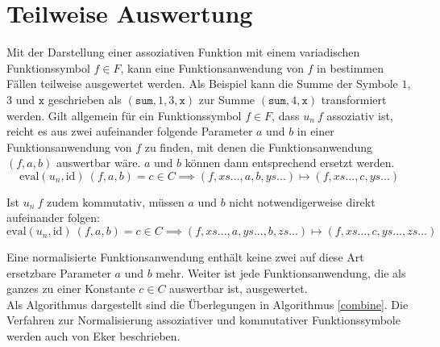 \section{Teilweise Auswertung} \label{subsecNormalKombinieren}

\begin{algorithm}
\DontPrintSemicolon
\caption{$\mathrm{combine} \colon T \rightarrow T$}\label{combine}

\end{algorithm}

Mit der Darstellung einer assoziativen Funktion mit einem variadischen Funktionssymbol $f \in F$, kann eine Funktionsanwendung von $f$ in bestimmen Fällen teilweise ausgewertet werden. Als Beispiel kann die Summe der Symbole $1$, $3$ und $\texttt{x}$ geschrieben als $(\texttt{sum}, 1, 3, \texttt{x})$ zur Summe $(\texttt{sum}, 4, \texttt{x})$ transformiert werden. 
Gilt allgemein für ein Funktionssymbol $f \in F$, dass $u_n~f$ assoziativ ist, reicht es aus zwei aufeinander folgende Parameter $a$ und $b$ in einer Funktionsanwendung von $f$ zu finden, mit denen die Funktionsanwendung $(f, a, b)$ auswertbar wäre. $a$ und $b$ können dann entsprechend ersetzt werden.
$$\mathrm{eval}(u_n, \mathrm{id})~(f, a, b) = c \in C \implies (f, xs..., a, b, ys...) \mapsto (f, xs..., c, ys...)$$

Ist $u_n~f$ zudem kommutativ, müssen $a$ und $b$ nicht notwendigerweise direkt aufeinander folgen:
$$\mathrm{eval}(u_n, \mathrm{id})~(f, a, b) = c \in C \implies (f, xs..., a, ys..., b, zs...) \mapsto (f, xs..., c, ys..., zs...)$$

Eine normalisierte Funktionsanwendung enthält keine zwei auf diese Art ersetzbare Parameter $a$ und $b$ mehr. Weiter ist jede Funktionsanwendung, die als ganzes zu einer Konstante $c \in C$ auswertbar ist, ausgewertet.\\
Als Algorithmus dargestellt sind die Überlegungen in Algorithmus \ref{combine}. Die Verfahren zur Normalisierung assoziativer und kommutativer Funktionssymbole werden auch von Eker \cite{BipartiteGraphMatching} beschrieben.

